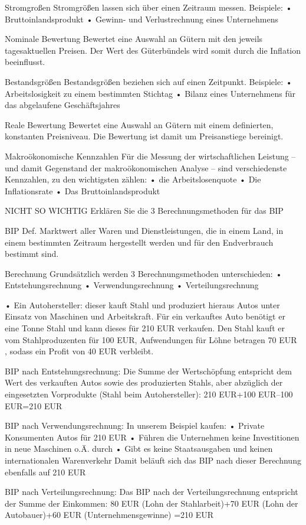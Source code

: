 Stromgroßen
Stromgrößen lassen sich über einen Zeitraum messen. Beispiele:
• Bruttoinlandsprodukt
• Gewinn- und Verlustrechnung eines Unternehmens

Nominale Bewertung
Bewertet eine Auswahl an Gütern mit den jeweils tagesaktuellen Preisen.
Der Wert des Güterbündels wird somit durch die Inflation beeinflusst.

Bestandsgrößen
Bestandsgrößen beziehen sich auf einen Zeitpunkt. Beispiele:
• Arbeitslosigkeit zu einem bestimmten Stichtag
• Bilanz eines Unternehmens für das abgelaufene Geschäftsjahres

Reale Bewertung
Bewertet eine Auswahl an Gütern mit einem definierten, konstanten
Preisniveau. Die Bewertung ist damit um Preisanstiege bereinigt.

Makroökonomische Kennzahlen
Für die Messung der wirtschaftlichen Leistung – und damit Gegenstand der makroökonomischen Analyse – sind verschiedenste Kennzahlen, zu den
wichtigsten zählen:
• die Arbeitslosenquote
• Die Inflationsrate
• Das Bruttoinlandsprodukt


NICHT SO WICHTIG
Erklären Sie die 3 Berechnungsmethoden für das BIP 

BIP Def.
Marktwert aller Waren und Dienstleistungen, die in einem Land, in
einem bestimmten Zeitraum hergestellt werden und für den
Endverbrauch bestimmt sind.

Berechnung
Grundsätzlich werden 3 Berechnungsmethoden unterschieden:
• Entstehungsrechnung
• Verwendungsrechnung
• Verteilungsrechnung


• Ein Autohersteller: dieser kauft Stahl und produziert hieraus
Autos unter Einsatz von Maschinen und Arbeitskraft.
Für ein verkauftes Auto benötigt er eine Tonne Stahl und kann
dieses für 210 EUR verkaufen. Den Stahl kauft er vom
Stahlproduzenten für 100 EUR, Aufwendungen für Löhne
betragen 70 EUR , sodass ein Profit von 40 EUR verbleibt.

BIP nach Entstehungsrechnung:
Die Summe der Wertschöpfung entspricht dem Wert des verkauften Autos sowie des
produzierten Stahls, aber abzüglich der eingesetzten Vorprodukte (Stahl beim Autohersteller):
210 EUR+100 EUR–100 EUR=210 EUR

BIP nach Verwendungsrechnung:
In unserem Beispiel kaufen:
• Private Konsumenten Autos für 210 EUR
• Führen die Unternehmen keine Investitionen in neue Maschinen o.Ä. durch
• Gibt es keine Staatsausgaben und keinen internationalen Warenverkehr
Damit beläuft sich das BIP nach dieser Berechnung ebenfalls auf 210 EUR

BIP nach Verteilungsrechnung:
Das BIP nach der Verteilungsrechnung entspricht der Summe der Einkommen:
80 EUR (Lohn der Stahlarbeit)+70 EUR (Lohn der Autobauer)+60 EUR (Unternehmensgewinne)
=210 EUR
